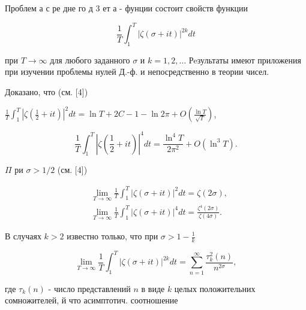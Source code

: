 \documentclass[10pt]{article}
\begin{document}
Проблем а с ре дне го д 3 ет а - фунции состоит свойств функции



\[

\frac{1}{T} \int_{1}^{T}|\zeta(\sigma+i t)|^{2 k} d t

\]



при $T \rightarrow \infty$ для любого заданного $\sigma$ и $k=1,2, \ldots$ Рeзультаты имеют приложения при изучении проблемы нулей Д.-ф. и непосредственно в теории чисел.



Доказано, что (см. [4])



$\frac{1}{T} \int_{1}^{T}\left|\zeta\left(\frac{1}{2}+i t\right)\right|^{2} d t=\ln T+2 C-1-\ln 2 \pi+O\left(\frac{\ln T}{\sqrt{T}}\right)$,



\[

\frac{1}{T} \int_{1}^{T}\left|\zeta\left(\frac{1}{2}+i t\right)\right|^{4} d t=\frac{\ln ^{4} T}{2 \pi^{2}}+O\left(\ln ^{3} T\right) .

\]



$\Pi$ ри $\sigma>1 / 2$ (см. [4])



\[

\begin{aligned}

& \lim _{T \rightarrow \infty} \frac{1}{T} \int_{1}^{T}|\zeta(\sigma+i t)|^{2} d t=\zeta(2 \sigma), \\

& \lim _{T \rightarrow \infty} \frac{1}{T} \int_{1}^{T}|\zeta(\sigma+i t)|^{4} d t=\frac{\zeta^{4}(2 \sigma)}{\zeta(4 \sigma)} .

\end{aligned}

\]



В случаях $k>2$ известно только, что при $\sigma>1-\frac{1}{k}$



\[

\lim _{T \rightarrow \infty} \frac{1}{T} \int_{1}^{T}|\zeta(\sigma+i t)|^{2 k} d t=\sum_{n=1}^{\infty} \frac{\tau_{k}^{2}(n)}{n^{2 \sigma}},

\]



где $\tau_{k}(n)$ - число представлений $n$ в виде $k$ целых положительних сомножителей, й что асимптотич. соотношение
\end{document}
